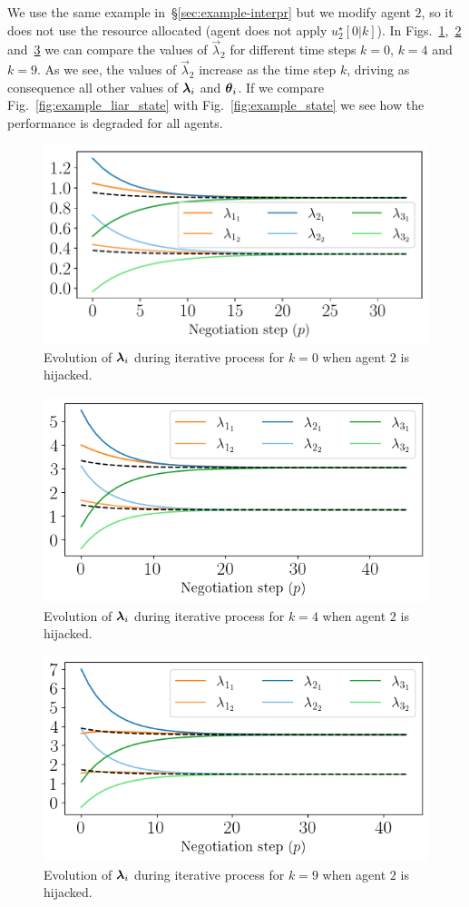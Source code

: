 \documentclass[../main.tex]{subfiles}
\begin{document}
We use the same example in~\S\ref{sec:example-interpr} but we modify agent $2$, so it does not use the resource allocated (agent does not apply $u_{2}^{\star}[0|k]$).
In Figs.~\ref{fig:example_liar_lambda1},~\ref{fig:example_liar_lambda5} and~\ref{fig:example_liar_lambda10} we can compare the values of $\vec{\lambda}_{2}$ for different time steps $k=0$, $k=4$ and $k=9$.
As we see, the values of $\vec{\lambda}_{2}$ increase as the time step $k$, driving as consequence all other values of $\boldsymbol{\lambda}_i$ and $\boldsymbol{\theta}_i$.
If we compare Fig.~\ref{fig:example_liar_state} with Fig.~\ref{fig:example_state} we see how the performance is degraded for all agents.
\begin{figure}[h]
  \centering
  \includegraphics[width=.5\textwidth]{../img/example_liar_lambda_k_0.pdf}
  \caption{Evolution of $\boldsymbol{\lambda}_i$ during iterative process for $k=0$ when agent $2$ is hijacked. }\label{fig:example_liar_lambda1}
\end{figure}

\begin{figure}[h]
  \centering
  \includegraphics[width=.5\textwidth]{../img/example_liar_lambda_k_4.png}
  \caption{Evolution of $\boldsymbol{\lambda}_i$ during iterative process for $k=4$ when agent $2$ is hijacked. }\label{fig:example_liar_lambda5}
\end{figure}

\begin{figure}[h]
  \centering
  \includegraphics[width=.5\textwidth]{../img/example_liar_lambda_k_9.png}
  \caption{Evolution of $\boldsymbol{\lambda}_i$ during iterative process for $k=9$ when agent $2$ is hijacked. }\label{fig:example_liar_lambda10}
\end{figure}
\end{document}
